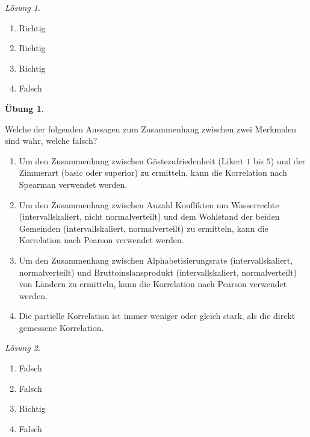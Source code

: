 \documentclass[
]{book}
\providecommand{\tightlist}{%
  \setlength{\itemsep}{0pt}\setlength{\parskip}{0pt}}
\theoremstyle{definition}
\theoremstyle{definition}
\theoremstyle{definition}
\newtheorem{exercise}{Übung}[chapter]
\theoremstyle{definition}
\theoremstyle{remark}
\newtheorem*{solution}{Lösung}
\begin{document}
\begin{solution}
\leavevmode

\begin{enumerate}
\def\labelenumi{\alph{enumi})}
\tightlist
\item
  Richtig
\item
  Richtig
\item
  Richtig
\item
  Falsch
\end{enumerate}

\end{solution}

\begin{exercise}
\protect\hypertarget{exr:test-theorie-korrelation1}{}\label{exr:test-theorie-korrelation1}

Welche der folgenden Aussagen zum Zusammenhang zwischen zwei Merkmalen sind wahr, welche falsch?

\begin{enumerate}
\def\labelenumi{\alph{enumi})}
\tightlist
\item
  Um den Zusammenhang zwischen Gästezufriedenheit (Likert \(1\) bis \(5\)) und der Zimmerart (basic oder superior) zu ermitteln, kann die Korrelation nach Spearman verwendet werden.
\item
  Um den Zusammenhang zwischen Anzahl Konflikten um Wasserrechte (intervallskaliert, nicht normalverteilt) und dem Wohlstand der beiden Gemeinden (intervallskaliert, normalverteilt) zu ermitteln, kann die Korrelation nach Pearson verwendet werden.
\item
  Um den Zusammenhang zwischen Alphabetisierungsrate (intervallskaliert, normalverteilt) und Bruttoinslansprodukt (intervallskaliert, normalverteilt) von Ländern zu ermitteln, kann die Korrelation nach Pearson verwendet werden.
\item
  Die partielle Korrelation ist immer weniger oder gleich stark, als die direkt gemessene Korrelation.
\end{enumerate}

\end{exercise}

\begin{solution}
\leavevmode

\begin{enumerate}
\def\labelenumi{\alph{enumi})}
\tightlist
\item
  Falsch
\item
  Falsch
\item
  Richtig
\item
  Falsch
\end{enumerate}

\end{solution}
\end{document}
